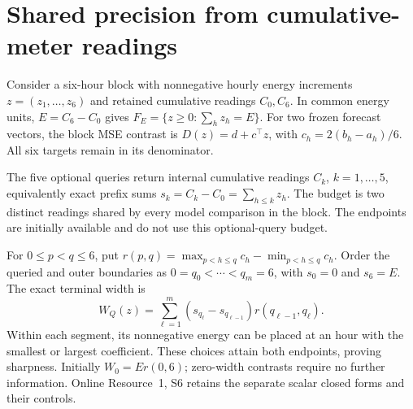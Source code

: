 \section{Shared precision from cumulative-meter readings}
\label{sec:counter-precision-method}
Consider a six-hour block with nonnegative hourly energy increments
$z=(z_1,\ldots,z_6)$ and retained cumulative readings $C_0,C_6$.
In common energy units, $E=C_6-C_0$ gives
$F_E=\{z\geq0:\sum_hz_h=E\}$. For two frozen forecast vectors,
the block MSE contrast is $D(z)=d+c^\top z$, with
$c_h=2(b_h-a_h)/6$. All six targets remain in its denominator.

The five optional queries return internal cumulative readings $C_k$,
$k=1,\ldots,5$, equivalently exact prefix sums
$s_k=C_k-C_0=\sum_{h\leq k}z_h$. The budget is two distinct readings
shared by every model comparison in the block. The endpoints are initially
available and do not use this optional-query budget.

For $0\leq p<q\leq6$, put
$r(p,q)=\max_{p<h\leq q}c_h-\min_{p<h\leq q}c_h$.
Order the queried and outer boundaries as $0=q_0<\cdots<q_m=6$,
with $s_0=0$ and $s_6=E$. The exact terminal width is
\begin{equation}
 W_Q(z)=\sum_{\ell=1}^{m}
 (s_{q_\ell}-s_{q_{\ell-1}})r(q_{\ell-1},q_\ell).
 \label{eq:counter-width}
\end{equation}
Within each segment, its nonnegative energy can be placed at an hour with
the smallest or largest coefficient. These choices attain both endpoints,
proving sharpness. Initially $W_0=Er(0,6)$; zero-width contrasts require
no further information. Online Resource~1, S6 retains the separate scalar
closed forms and their controls.
